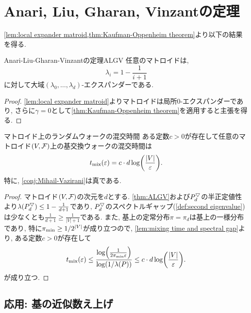 \section{Anari, Liu, Gharan, Vinzantの定理}
\cref{lem:local expander matroid,thm:Kaufman-Oppenheim theorem}より以下の結果を得る.
\begin{theorem}{Anari-Liu-Gharan-Vinzantの定理}{ALGV}
    任意のマトロイドは,
    \[ \lambda_i = 1-\frac{1}{i+1}\]
    に対して大域$(\lambda_0,\dots,\lambda_d)$-エクスパンダーである.
\end{theorem}
\begin{proof}
    \cref{lem:local expander matroid}よりマトロイドは局所$0$-エクスパンダーであり, さらに$\gamma=0$として\cref{thm:Kaufman-Oppenheim theorem}を適用すると主張を得る.
\end{proof}
\begin{corollary}{マトロイド上のランダムウォークの混交時間}{}
    ある定数$c>0$が存在して任意のマトロイド$(V,\mathcal{F})$上の基交換ウォークの混交時間は
    \[
        \tmix(\varepsilon) = c\cdot d\log\rbra*{\frac{|V|}{\varepsilon}}.
    \]
    特に, \cref{conj:Mihail-Vazirani}は真である.
\end{corollary}
\begin{proof}
    マトロイド$(V,\mathcal{F})$の次元を$d$とする.
    \cref{thm:ALGV}および$P^{\bigtriangledown}_d$の半正定値性より$\lambda(P^{\bigtriangledown}_d) \le 1-\frac{1}{d+1}$であり, $P^{\bigtriangledown}_d$のスペクトルギャップ(\cref{def:second eigenvalue})は少なくとも$\frac{1}{d+1} \ge \frac{1}{|V|+1}$である.
    また, 基上の定常分布$\pi=\pi_d$は基上の一様分布であり, 特に$\pi_{\min} \ge 1/2^{|V|}$が成り立つので, \cref{lem:mixing time and spectral gap}より, ある定数$c>0$が存在して
    \[
        \tmix(\varepsilon) \le \frac{\log\rbra*{\frac{1}{2\pimin\varepsilon}}}{\log(1/\lambda(P))} \le c\cdot d\log\rbra*{\frac{|V|}{\varepsilon}}.
    \]
    が成り立つ.
\end{proof}

\subsection{応用: 基の近似数え上げ}


